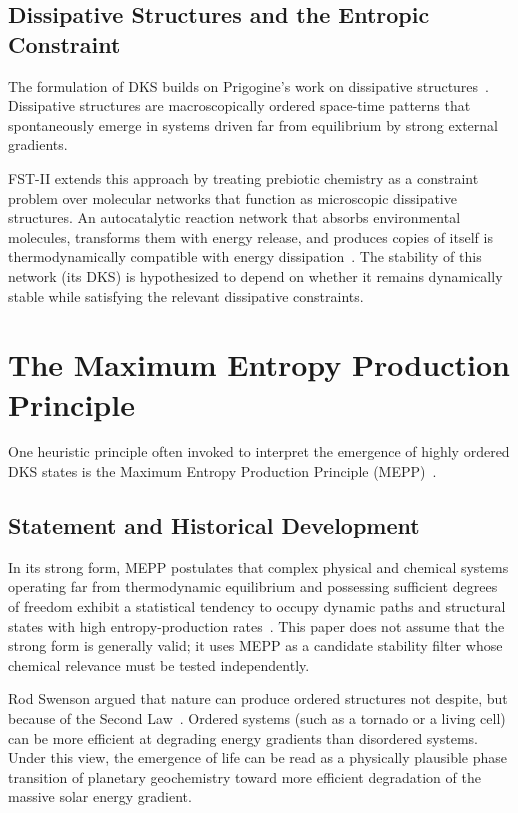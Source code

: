 \documentclass[12pt,a4paper]{article}
\theoremstyle{remark}
\begin{document}
\subsection{Dissipative Structures and the Entropic Constraint}

The formulation of DKS builds on Prigogine's work on dissipative structures~\citep{Bioenergetics}. Dissipative structures are macroscopically ordered space-time patterns that spontaneously emerge in systems driven far from equilibrium by strong external gradients.

FST-II extends this approach by treating prebiotic chemistry as a constraint problem over molecular networks that function as microscopic dissipative structures. An autocatalytic reaction network that absorbs environmental molecules, transforms them with energy release, and produces copies of itself is thermodynamically compatible with energy dissipation~\citep{Bioenergetics}. The stability of this network (its DKS) is hypothesized to depend on whether it remains dynamically stable while satisfying the relevant dissipative constraints.

\section{The Maximum Entropy Production Principle}
\label{sec:mepp}

One heuristic principle often invoked to interpret the emergence of highly ordered DKS states is the Maximum Entropy Production Principle (MEPP)~\citep{EntropyMEPP,MEPP2006}.

\subsection{Statement and Historical Development}

In its strong form, MEPP postulates that complex physical and chemical systems operating far from thermodynamic equilibrium and possessing sufficient degrees of freedom exhibit a statistical tendency to occupy dynamic paths and structural states with high entropy-production rates~\citep{ThermodynamicsOrganisms}. This paper does not assume that the strong form is generally valid; it uses MEPP as a candidate stability filter whose chemical relevance must be tested independently.

Rod Swenson argued that nature can produce ordered structures not despite, but because of the Second Law~\citep{ThermodynamicsLife}. Ordered systems (such as a tornado or a living cell) can be more efficient at degrading energy gradients than disordered systems. Under this view, the emergence of life can be read as a physically plausible phase transition of planetary geochemistry toward more efficient degradation of the massive solar energy gradient.
\end{document}
